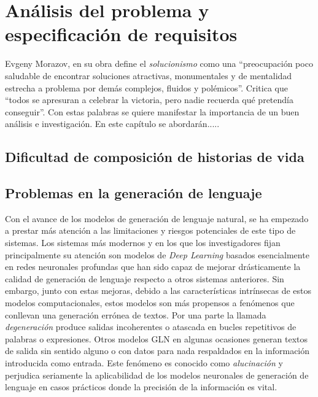\chapter{Análisis del problema y especificación de requisitos}
\label{cap:analisisYRequisitos}

Evgeny Morazov, en su obra \citep{morozov2015la} define el \textit{solucionismo} como una ``preocupación poco saludable de encontrar soluciones atractivas, monumentales y de mentalidad estrecha a problema por demás complejos, fluidos y polémicos''. Critica que ``todos se apresuran a  celebrar la victoria, pero nadie recuerda qué pretendía conseguir''. Con estas palabras se quiere manifestar la importancia de un buen análisis e investigación. En este capítulo se abordarán.....



\section{Dificultad de composición de historias de vida}


\section{Problemas en la generación de lenguaje}




Con el avance de los modelos de generación de lenguaje natural, se ha empezado a prestar más atención a las limitaciones y riesgos potenciales de este tipo de sistemas. Los sistemas más modernos y en los que los investigadores fijan principalmente su atención son modelos de \textit{Deep Learning} basados esencialmente en redes neuronales profundas que han sido capaz de mejorar drásticamente la calidad de generación de lenguaje respecto a otros sistemas anteriores. Sin embargo, junto con estas mejoras, debido a las características intrínsecas de estos modelos computacionales, estos modelos son más propensos a fenómenos que conllevan una generación errónea de textos. Por una parte la llamada \textit{degeneración} produce salidas incoherentes o atascada en bucles repetitivos de palabras o expresiones. Otros modelos GLN en algunas ocasiones generan textos de salida sin sentido alguno o con datos para nada respaldados en la información introducida como entrada. Este fenómeno es conocido como \textit{alucinación} y perjudica seriamente la aplicabilidad de los modelos neuronales de generación de lenguaje en casos prácticos donde la precisión de la información es vital.

